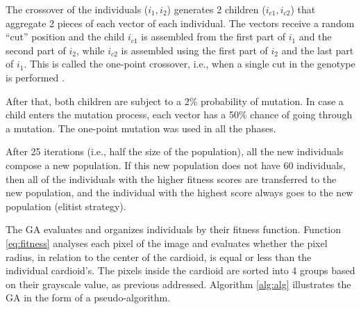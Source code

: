 \documentclass[conference]{IEEEtran}
\begin{document}

The crossover of the individuals ($i_1 , i_2$) generates 2 children ($i_{c1}, i_{c2}$) that aggregate 2 pieces of each vector of each individual. The vectors receive a random ``cut'' position and the child $i_{c1}$ is assembled from the first part of $i_1$ and the second part of $i_2$, while $i_{c2}$ is assembled using the first part of $i_2$ and the last part of $i_1$. This is called the one-point  crossover, i.e., when a single cut in the genotype is performed \cite{poli98}.

After that, both children are subject to a 2\% probability of mutation. In case a child enters the mutation process, each vector has a 50\% chance of going through a mutation. The one-point mutation was used in all the phases.

After 25 iterations (i.e., half the size of the population), all the new individuals compose a new population. If this new population does not have 60 individuals, then all of the individuals with the higher fitness scores are transferred to the new population, and the individual with the highest score always goes to the new population (elitist strategy).


The GA evaluates and organizes individuals by their fitness function. Function \ref{eq:fitness} analyses each pixel of the image and evaluates whether the pixel radius, in relation to the center of the cardioid, is equal or less than the individual cardioid's. The pixels inside the cardioid are sorted into 4 groups based on their grayscale value, as previous addressed. Algorithm  \ref{alg:alg} illustrates the GA in the form of a pseudo-algorithm. %
          


\end{document}
